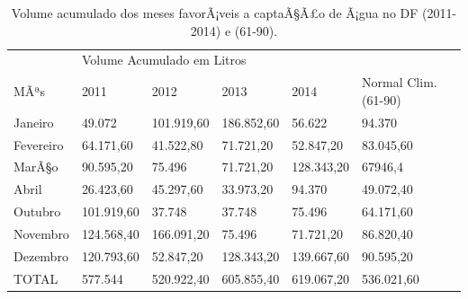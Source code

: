 \begin{table}[h]
\centering
\caption{Volume acumulado dos meses favorÃ¡veis a captaÃ§Ã£o de Ã¡gua no DF (2011-2014) e (61-90).}
\label{Volume acumulado dos meses favorÃ¡veis a captaÃ§Ã£o de Ã¡gua no DF (2011-2014) e (61-90).}
\begin{tabular}{llllll}
 &  &  &  &  &  \\ \hline
\multicolumn{1}{|l|}{} & \multicolumn{5}{l|}{Volume Acumulado em Litros} \\ \hline
\multicolumn{1}{|l|}{MÃªs} & \multicolumn{1}{l|}{2011} & \multicolumn{1}{l|}{2012} & \multicolumn{1}{l|}{2013} & \multicolumn{1}{l|}{2014} & \multicolumn{1}{l|}{Normal Clim. (61-90)} \\ \hline
\multicolumn{1}{|l|}{Janeiro} & \multicolumn{1}{l|}{49.072} & \multicolumn{1}{l|}{101.919,60} & \multicolumn{1}{l|}{186.852,60} & \multicolumn{1}{l|}{56.622} & \multicolumn{1}{l|}{94.370} \\ \hline
\multicolumn{1}{|l|}{Fevereiro} & \multicolumn{1}{l|}{64.171,60} & \multicolumn{1}{l|}{41.522,80} & \multicolumn{1}{l|}{71.721,20} & \multicolumn{1}{l|}{52.847,20} & \multicolumn{1}{l|}{83.045,60} \\ \hline
\multicolumn{1}{|l|}{MarÃ§o} & \multicolumn{1}{l|}{90.595,20} & \multicolumn{1}{l|}{75.496} & \multicolumn{1}{l|}{71.721,20} & \multicolumn{1}{l|}{128.343,20} & \multicolumn{1}{l|}{67946,4} \\ \hline
\multicolumn{1}{|l|}{Abril} & \multicolumn{1}{l|}{26.423,60} & \multicolumn{1}{l|}{45.297,60} & \multicolumn{1}{l|}{33.973,20} & \multicolumn{1}{l|}{94.370} & \multicolumn{1}{l|}{49.072,40} \\ \hline
\multicolumn{1}{|l|}{Outubro} & \multicolumn{1}{l|}{101.919,60} & \multicolumn{1}{l|}{37.748} & \multicolumn{1}{l|}{37.748} & \multicolumn{1}{l|}{75.496} & \multicolumn{1}{l|}{64.171,60} \\ \hline
\multicolumn{1}{|l|}{Novembro} & \multicolumn{1}{l|}{124.568,40} & \multicolumn{1}{l|}{166.091,20} & \multicolumn{1}{l|}{75.496} & \multicolumn{1}{l|}{71.721,20} & \multicolumn{1}{l|}{86.820,40} \\ \hline
\multicolumn{1}{|l|}{Dezembro} & \multicolumn{1}{l|}{120.793,60} & \multicolumn{1}{l|}{52.847,20} & \multicolumn{1}{l|}{128.343,20} & \multicolumn{1}{l|}{139.667,60} & \multicolumn{1}{l|}{90.595,20} \\ \hline
\multicolumn{1}{|l|}{TOTAL} & \multicolumn{1}{l|}{577.544} & \multicolumn{1}{l|}{520.922,40} & \multicolumn{1}{l|}{605.855,40} & \multicolumn{1}{l|}{619.067,20} & \multicolumn{1}{l|}{536.021,60} \\ \hline
\end{tabular}
\end{table}

